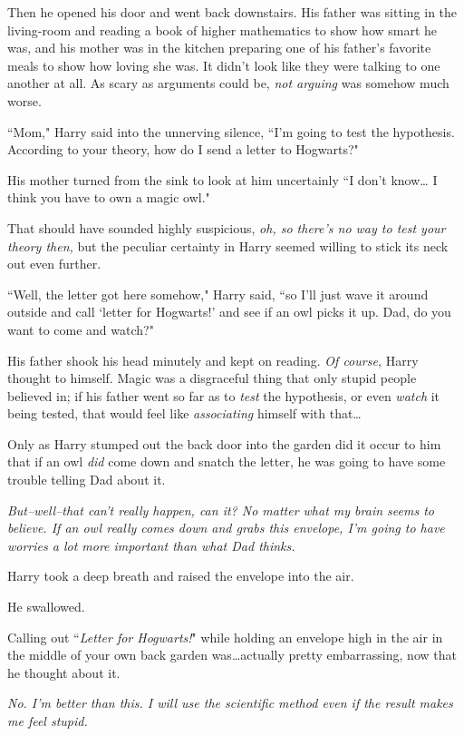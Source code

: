 Then he opened his door and went back downstairs. His father was sitting in the living-room and reading a book of higher mathematics to show how smart he was, and his mother was in the kitchen preparing one of his father's favorite meals to show how loving she was. It didn't look like they were talking to one another at all. As scary as arguments could be, \emph{not arguing} was somehow much worse.

``Mom," Harry said into the unnerving silence, ``I'm going to test the hypothesis. According to your theory, how do I send a letter to Hogwarts?"

His mother turned from the sink to look at him uncertainly ``I don't know{\ldots} I think you have to own a magic owl."

That should have sounded highly suspicious, \emph{oh, so there's no way to test your theory then,} but the peculiar certainty in Harry seemed willing to stick its neck out even further.

``Well, the letter got here somehow," Harry said, ``so I'll just wave it around outside and call `letter for Hogwarts!' and see if an owl picks it up. Dad, do you want to come and watch?"

His father shook his head minutely and kept on reading. \emph{Of course,} Harry thought to himself. Magic was a disgraceful thing that only stupid people believed in; if his father went so far as to \emph{test} the hypothesis, or even \emph{watch} it being tested, that would feel like \emph{associating} himself with that{\ldots}

Only as Harry stumped out the back door into the garden did it occur to him that if an owl \emph{did} come down and snatch the letter, he was going to have some trouble telling Dad about it.

\emph{But\---well\---that can't \emph{really} happen, can it? No matter what my brain seems to believe. If an owl really comes down and grabs this envelope, I'm going to have worries a lot more important than what Dad thinks.}

Harry took a deep breath and raised the envelope into the air.

He swallowed.

Calling out ``\emph{Letter for Hogwarts!}" while holding an envelope high in the air in the middle of your own back garden was{\ldots}actually pretty embarrassing, now that he thought about it.

\emph{No. I'm better than this. I will use the scientific method even if the result makes me feel stupid.}

